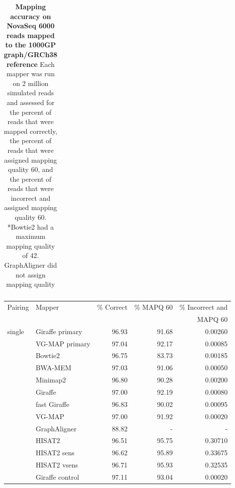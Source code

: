 \documentclass[11pt]{ucscthesis}
\begin{document}
\begin{table}[H]
\begin{tabular}{|l|l|r|r|r|}
 
        \hline
        
    \end{tabular}
    \caption[Mapping accuracy on NovaSeq 6000 reads mapped to the 1000GP graph/GRCh38 reference]{\textbf{Mapping accuracy on NovaSeq 6000 reads mapped to the 1000GP graph/GRCh38 reference} Each mapper was run on 2 million simulated reads and assessed for the percent of reads that were mapped correctly, the percent of reads that were assigned mapping quality 60, and the percent of reads that were incorrect and assigned mapping quality 60. *Bowtie2 had a maximum mapping quality of 42. GraphAligner did not assign mapping quality}
    \label{tab:mapping_accuracy_1kg_novaseq6000}
    \label{tab:first}
\end{table}

\begin{table}[H]
    \centering
    \begin{tabular}{|l|l|r|r|r|}
    \hline
        Pairing & Mapper & \% Correct & \% MAPQ 60 & \% Incorrect and \\
               &         &            &            & MAPQ 60          \\
        \hline
        single  & Giraffe primary	& 96.93     & 91.68     & 0.00260 \\
                & VG-MAP primary	& 97.04     & 92.17     & 0.00085 \\
                & Bowtie2       	& 96.75     & 83.73     & 0.00185 \\
                & BWA-MEM	        & 97.03     & 91.06     & 0.00050 \\
                & Minimap2	        & 96.80     & 90.28     & 0.00200 \\
                & Giraffe	        & 97.00     & 92.19     & 0.00080 \\
                & fast Giraffe	    & 96.83     & 90.02     & 0.00095 \\
                & VG-MAP	        & 97.00     & 91.92     & 0.00020 \\
                & GraphAligner 	    & 88.82     & -         & - \\
                & HISAT2	        & 96.51     & 95.75     & 0.30710 \\
                & HISAT2 sens	    & 96.62     & 95.89     & 0.33675 \\
                & HISAT2 vsens  	& 96.71     & 95.93     & 0.32535 \\
                & Giraffe control	& 97.11     & 93.04     & 0.00020 \\


\end{tabular}
\end{table}
\end{document}

